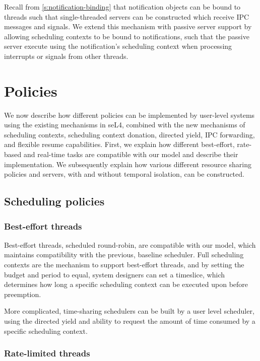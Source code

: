 Recall from \cref{s:notification-binding} that notification objects can be bound to threads such that single-threaded servers can be 
constructed which receive IPC messages and signals. We extend this mechanism with passive server
support by allowing scheduling contexts to be bound to notifications, such that the passive server
execute using the notification's scheduling context when processing interrupts or signals from other
threads. 

\section{Policies}
\label{sec:model-policies}

We now describe how different policies can be implemented by user-level systems using the 
existing mechanisms in seL4, combined with the new mechanisms of scheduling contexts,
scheduling context donation, directed yield, IPC forwarding, and flexible resume capabilities.
First, we explain how different best-effort, rate-based and real-time tasks are compatible
with our model and describe their implementation. We subsequently explain how various different 
resource sharing policies and servers, with and without temporal isolation, can be constructed. 

\subsection{Scheduling policies}

\subsubsection{Best-effort threads}

Best-effort threads, scheduled round-robin, are compatible with our model, which maintains
compatibility with the previous, baseline \selfour scheduler.  Full scheduling contexts are the
mechanism to support best-effort threads, and by setting the budget and period to equal, system
designers can set a timeslice, which determines how long a specific scheduling context can be
executed upon before preemption.

More complicated, time-sharing schedulers can be built by a user level scheduler, using the directed
yield and ability to request the amount of time consumed by a specific scheduling context.

\subsubsection{Rate-limited threads}

